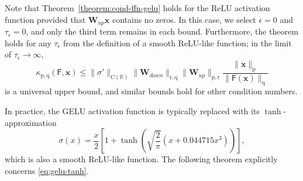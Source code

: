 \documentclass[namedate,webpdf,imanum]{ima-authoring-template}
\newcommand{\Real}{\mathbb{R}}
\newcommand{\Matrix}[1]{\mathbf{#1}}
\newcommand{\Norm}[3][]{#1\| #2 #1\|_{\mathrm{#3}}}
\newcommand{\Layer}[1]{\mathsf{#1}}
\newcommand{\cond}[3][]{\kappa_{\mathrm{#2}} #1( #3 #1)}
\numberwithin{equation}{section}
\begin{document}
Note that Theorem~\ref{theorem:cond-ffn-gelu} holds for the ReLU activation function provided that $\Matrix{W}_{up} \Matrix{x}$ contains no zeros.
In this case, we select $\epsilon = 0$ and $\tau_{\epsilon} = 0$, and only the third term remains in each bound.
Furthermore, the theorem holds for any $\tau_\epsilon$ from the definition of a smooth ReLU-like function; in the limit of $\tau_\epsilon \to \infty$,
\begin{equation}
\label{eq:cond-ffn-gelu-universal}
    \cond{p,q}{\Layer{F}, \Matrix{x}} \leq \Norm{\sigma'}{C(\Real)} \Norm{\Matrix{W}_{down}}{r,q} \Norm{\Matrix{W}_{up}}{p,r} \frac{\Norm{\Matrix{x}}{p}}{\Norm{\Layer{F}(\Matrix{x})}{q}}
\end{equation}
is a universal upper bound, and similar bounds hold for other condition numbers.

In practice, the GELU activation function is typically replaced with its $\tanh$-approximation
\begin{equation}
\label{eq:gelu-tanh}
    \sigma(x) = \frac{x}{2} \left[ 1 + \tanh\left( \sqrt{\frac{2}{\pi}} (x + 0.044715 x^3) \right) \right],
\end{equation}
which is also a smooth ReLU-like function.
The following theorem explicitly concerns \eqref{eq:gelu-tanh}.
\end{document}
